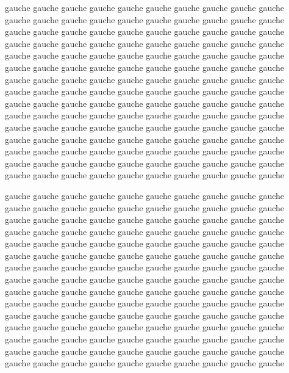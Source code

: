 \documentclass[openany]{book}
\begin{document}
\begin{pages}
\begin{Leftside}
\pstart
%
gauche gauche gauche gauche gauche gauche gauche gauche gauche gauche
gauche gauche gauche gauche gauche gauche gauche gauche gauche gauche
gauche gauche gauche gauche gauche gauche gauche gauche gauche gauche
gauche gauche gauche gauche gauche gauche gauche gauche gauche gauche
gauche gauche gauche gauche gauche gauche gauche gauche gauche gauche
gauche gauche gauche gauche gauche gauche gauche gauche gauche gauche
gauche gauche gauche gauche gauche gauche gauche gauche gauche gauche
gauche gauche gauche gauche gauche gauche gauche gauche gauche gauche
gauche gauche gauche gauche gauche gauche gauche gauche gauche gauche
gauche gauche gauche gauche gauche gauche gauche gauche gauche gauche
gauche gauche gauche gauche gauche gauche gauche gauche gauche gauche
gauche gauche gauche gauche gauche gauche gauche gauche gauche gauche
gauche gauche gauche gauche gauche gauche gauche gauche gauche gauche
gauche gauche gauche gauche gauche gauche gauche gauche gauche gauche
gauche gauche gauche gauche gauche gauche gauche gauche gauche gauche
%
\pend

\pstart
%
gauche gauche gauche gauche gauche gauche gauche gauche gauche gauche
gauche gauche gauche gauche gauche gauche gauche gauche gauche gauche
gauche gauche gauche gauche gauche gauche gauche gauche gauche gauche
gauche gauche gauche gauche gauche gauche gauche gauche gauche gauche
gauche gauche gauche gauche gauche gauche gauche gauche gauche gauche
gauche gauche gauche gauche gauche gauche gauche gauche gauche gauche
gauche gauche gauche gauche gauche gauche gauche gauche gauche gauche
gauche gauche gauche gauche gauche gauche gauche gauche gauche gauche
gauche gauche gauche gauche gauche gauche gauche gauche gauche gauche
gauche gauche gauche gauche gauche gauche gauche gauche gauche gauche
gauche gauche gauche gauche gauche gauche gauche gauche gauche gauche
gauche gauche gauche gauche gauche gauche gauche gauche gauche gauche
gauche gauche gauche gauche gauche gauche gauche gauche gauche gauche
gauche gauche gauche gauche gauche gauche gauche gauche gauche gauche
gauche gauche gauche gauche gauche gauche gauche gauche gauche gauche
%
\pend



\endnumbering
\end{Leftside}

\begin{Rightside}
\beginnumbering


\end{Rightside}
\end{pages}
\end{document}
